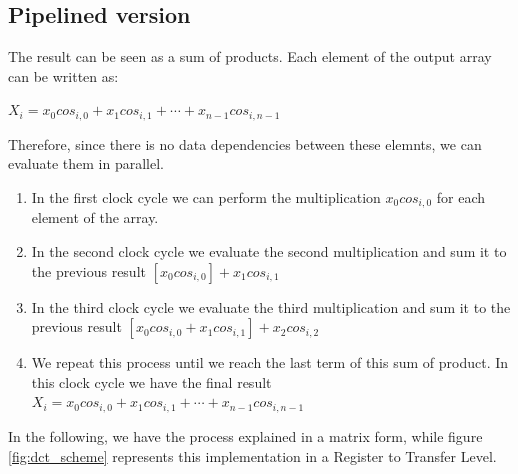   \subsection{Pipelined version}
The result can be seen as a sum of products.
Each element of the output array can be written as:
\begin{center}
	$ X_{i} =  x_{0}cos_{i,0}+x_{1}cos_{i,1}+ \cdots +x_{n-1}cos_{i,n-1}$
\end{center}

Therefore, since there is no data dependencies between these elemnts, we can evaluate them in parallel.
\begin{enumerate}
\item In the first clock cycle we can perform the multiplication $ x_{0}cos_{i,0} $ for each element of the array.
\item In the second clock cycle we evaluate the second multiplication and sum it to the previous result $  [x_{0}cos_{i,0}] + x_{1}cos_{i,1} $
\item In the third clock cycle we evaluate the third multiplication and sum it to the previous result $  [x_{0}cos_{i,0} + x_{1}cos_{i,1}] + x_{2}cos_{i,2}$
\item We repeat this process until we reach the last term of this sum of product. In this clock cycle we have the final result $ X_{i} =  x_{0}cos_{i,0}+x_{1}cos_{i,1}+ \cdots +x_{n-1}cos_{i,n-1}  $

\end{enumerate}

In the following, we have the process explained in a matrix form, while figure \ref{fig:dct_scheme} represents this implementation in a Register to Transfer Level.


